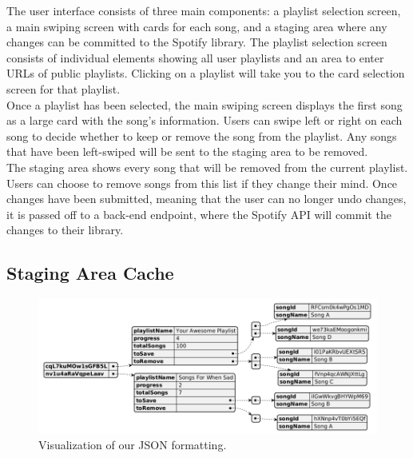 \documentclass{article}
\begin{document}
\quad The user interface consists of three main components: a playlist selection screen, a main swiping screen with cards for each song, and a staging area where any changes can be committed to the Spotify library. The playlist selection screen consists of individual elements showing all user playlists and an area to enter URLs of public playlists. Clicking on a playlist will take you to the card selection screen for that playlist. \\

\quad Once a playlist has been selected, the main swiping screen displays the first song as a large card with the song's information. Users can swipe left or right on each song to decide whether to keep or remove the song from the playlist. Any songs that have been left-swiped will be sent to the staging area to be removed. \\

\quad The staging area shows every song that will be removed from the current playlist.  Users can choose to remove songs from this list if they change their mind.  Once changes have been submitted, meaning that the user can no longer undo changes, it is passed off to a back-end endpoint, where the Spotify API will commit the changes to their library. \\

\subsection{Staging Area Cache}

\begin{figure}[ht]
  \centering
  \includegraphics[width=6in]{./json2.png}
  \caption{Visualization of our JSON formatting.}
  \label{fig:jsondiagram}
\end{figure}
\end{document}
